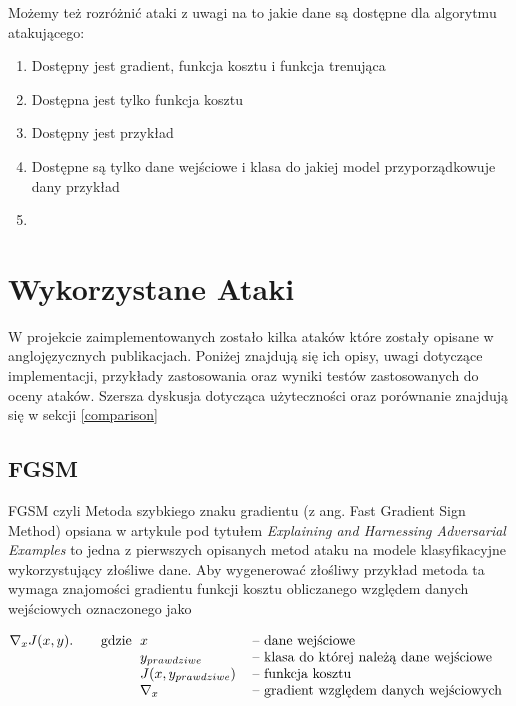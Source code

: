 \documentclass{article}
\begin{document}
Możemy też rozróżnić ataki z uwagi na to jakie dane są dostępne dla algorytmu atakującego:
\begin{enumerate}
    \item Dostępny jest gradient, funkcja kosztu i funkcja trenująca
    \item Dostępna jest tylko funkcja kosztu
    \item Dostępny jest przykład
    \item Dostępne są tylko dane wejściowe i klasa do jakiej model przyporządkowuje dany przykład
    \item {}
\end{enumerate}


\section{Wykorzystane Ataki}
W projekcie zaimplementowanych zostało kilka ataków które zostały opisane w anglojęzycznych publikacjach.
Poniżej znajdują się ich opisy, uwagi dotyczące implementacji, przykłady zastosowania oraz wyniki testów
zastosowanych do oceny ataków. Szersza dyskusja dotycząca użyteczności oraz porównanie znajdują się w sekcji \ref{comparison}

\subsection{FGSM}
    FGSM czyli Metoda szybkiego znaku gradientu (z ang. Fast Gradient Sign Method) opsiana w artykule
    pod tytułem \textit{Explaining and Harnessing Adversarial Examples}\cite{harnessing} to jedna z pierwszych
    opisanych metod ataku na modele klasyfikacyjne wykorzystujący złośliwe dane.
    Aby wygenerować złośliwy przykład metoda ta wymaga znajomości gradientu funkcji kosztu obliczanego względem danych
    wejściowych oznaczonego jako

    \begin{equation}
        \nabla_{x} J(x, y).
        \qquad\text{gdzie}
        \begin{tabular}[t]{ll}
        $x$   & -- dane wejściowe \\
        $y_{prawdziwe}$   & -- klasa do której należą dane wejściowe\\
        $J(x, y_{prawdziwe})$  & -- funkcja kosztu \\
        $\nabla_{x}$  & -- gradient względem danych wejściowych \\
        \end{tabular}
    \end{equation}
\end{document}
